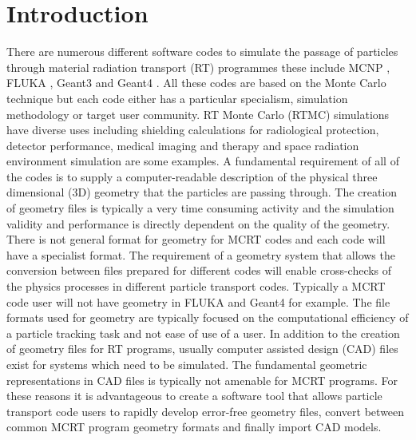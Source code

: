 \documentclass[final,5p,times,twocolumn]{elsarticle}
\begin{document}
\begin{small}

\end{small}

\section{Introduction} \label{sec:introduction}
There are numerous different software codes to simulate the passage of particles through material radiation transport (RT) programmes these 
include MCNP \cite{Mcnp_Werner}, FLUKA \cite{Fluka_Ferrari,Fluka_Bohlen}, Geant3 \cite{Geant3_Brun} and Geant4 \cite{Geant4_Agostinelli}. 
All these codes are based on the Monte Carlo technique but each code either has a particular specialism, simulation methodology or target user community.  
RT Monte Carlo (RTMC) simulations have diverse uses including shielding calculations for radiological protection, detector performance, medical imaging and therapy and space radiation environment  simulation are some examples. A fundamental requirement of all of the codes is to supply a computer-readable description of the 
physical three dimensional (3D) geometry that  the particles are passing through.  The creation of geometry files is typically a very time consuming 
activity and the simulation validity and performance is directly dependent on the quality of the geometry. There is not general format for geometry for MCRT 
codes and each code will have a specialist format. The requirement of a geometry system that allows the conversion between files prepared for different 
codes will enable cross-checks of the physics processes in different particle transport codes. Typically a MCRT code user will not have geometry in FLUKA 
and Geant4 for example. The file formats used for geometry are typically focused on the computational efficiency of a particle tracking task and not ease of use of a user. In addition to the creation of geometry files for RT programs, usually computer assisted design (CAD) files exist for systems which 
need to be simulated. The fundamental geometric representations in CAD files is typically not amenable for MCRT programs.  For these reasons it is 
advantageous to create a software tool that allows particle transport code users to rapidly develop error-free geometry files, convert between common MCRT 
program geometry formats and finally import CAD models. 
\end{document}
